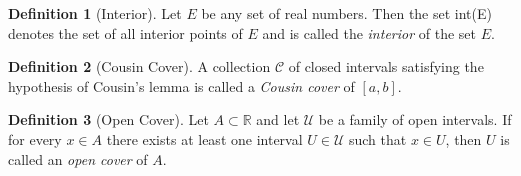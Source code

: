 \documentclass[11pt]{article}
\def \R {\mathbb{R}}
\theoremstyle{definition}
\newtheorem{definition}{Definition}[section]
\begin{document}
\setcounter{definition}{13}
\begin{definition} [Interior]
	Let $ E $ be any set of real numbers. Then the set int(E) denotes the set of all interior points of $ E $ and is called the \textit{interior} of the set $ E $.
\end{definition}

\setcounter{definition}{26}
\begin{definition} [Cousin Cover]
	A collection $ \mathcal{C} $ of closed intervals satisfying the hypothesis of Cousin’s
	lemma is called a \textit{Cousin cover} of $ [a, b] $.
\end{definition}

\def \scriptU {\mathcal{U}}
\begin{definition} [Open Cover]
	Let $ A \subset \R $ and let $ \scriptU $ be a family of open intervals. If for every $ x \in A $ there exists at least one interval $ U \in \scriptU $ such that $ x \in U $, then $ U $ is called an \textit{open cover} of $ A $.
\end{definition}
\end{document}
